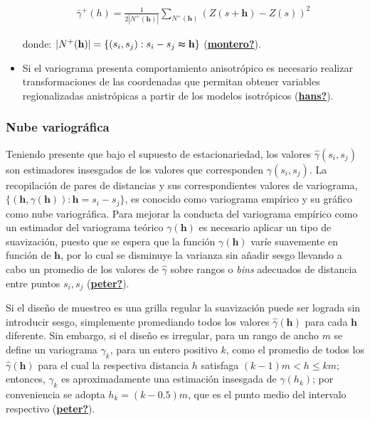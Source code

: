\documentclass[
]{book}
\begin{document}
\begin{itemize}
  \begin{align}
      \bar{\gamma}^+(h)=\frac{1}{2|N^+(\textbf{h})|}\sum_{N^+(\textbf{h})}(Z(s+\textbf{h})-Z(s))^2  
    \end{align}

  donde: \(|N^+(\textbf{h})|=\{(s_i,s_j): s_i-s_j \thickapprox \textbf{h}\}\) (\protect\hyperlink{ref-montero}{\textbf{montero?}}).
\item
  Si el variograma presenta comportamiento anisotrópico es necesario realizar transformaciones de las coordenadas que permitan obtener variables regionalizadas anistrópicas a partir de los modelos isotrópicos (\protect\hyperlink{ref-hans}{\textbf{hans?}}).
\end{itemize}

\hypertarget{nube-variogruxe1fica}{%
\subsubsection*{Nube variográfica}\label{nube-variogruxe1fica}}

Teniendo presente que bajo el supuesto de estacionariedad, los valores \(\hat{\gamma}(s_i,s_j)\) son estimadores insesgados de los valores que corresponden \(\gamma(s_i,s_j)\). La recopilación de pares de distancias y sus correspondientes valores de variograma, \(\{(\textbf{h},\gamma(\textbf{h})): \textbf{h}=s_i-s_j\}\), es conocido como variograma empírico y su gráfico como nube variográfica. Para mejorar la conducta del variograma empírico como un estimador del variograma teórico \(\gamma(\textbf{h})\) es necesario aplicar un tipo de suavización, puesto que se espera que la función \(\gamma(\textbf{h})\) varíe suavemente en función de \(\textbf{h}\), por lo cual se disminuye la varianza sin añadir sesgo llevando a cabo un promedio de los valores de \(\hat{\gamma}\) sobre rangos o \textit{bins} adecuados de distancia entre puntos \(s_i,s_j\) (\protect\hyperlink{ref-peter}{\textbf{peter?}}).

Si el diseño de muestreo es una grilla regular la suavización puede ser lograda sin introducir sesgo, simplemente promediando todos los valores \(\hat{\gamma}(\textbf{h})\) para cada \(\textbf{h}\) diferente. Sin embargo, si el diseño es irregular, para un rango de ancho \(m\) se define un variograma \(\gamma_k\), para un entero positivo \(k\), como el promedio de todos los \(\hat{\gamma}(\textbf{h})\) para el cual la respectiva distancia \(h\) satisfaga \((k-1)m<h\leq km\); entonces, \(\gamma_k\) es aproximadamente una estimación insesgada de \(\gamma(h_k)\); por conveniencia se adopta \(h_k=(k-0.5)m\), que es el punto medio del intervalo respectivo (\protect\hyperlink{ref-peter}{\textbf{peter?}}).
\end{document}
